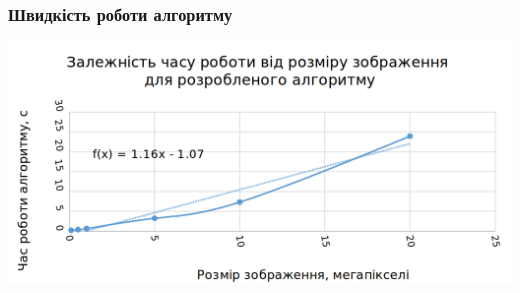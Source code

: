 \documentclass[12pt]{beamer}
\begin{document}
\begin{frame}\frametitle{ Швидкість роботи алгоритму }
	\includegraphics[scale=0.25]{images/super_graph}
\end{frame}
\end{document}
